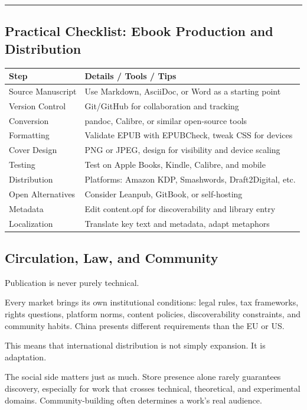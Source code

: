 \documentclass[
]{article}
\begin{document}
\begin{center}\rule{0.5\linewidth}{0.5pt}\end{center}

\hypertarget{practical-checklist-ebook-production-and-distribution}{%
\subsection{Practical Checklist: Ebook Production and
Distribution}\label{practical-checklist-ebook-production-and-distribution}}

\begin{longtable}[]{@{}ll@{}}
\toprule
Step & Details / Tools / Tips\tabularnewline
\midrule
\endhead
Source Manuscript & Use Markdown, AsciiDoc, or Word as a starting
point\tabularnewline
Version Control & Git/GitHub for collaboration and
tracking\tabularnewline
Conversion & pandoc, Calibre, or similar open-source
tools\tabularnewline
Formatting & Validate EPUB with EPUBCheck, tweak CSS for
devices\tabularnewline
Cover Design & PNG or JPEG, design for visibility and device
scaling\tabularnewline
Testing & Test on Apple Books, Kindle, Calibre, and
mobile\tabularnewline
Distribution & Platforms: Amazon KDP, Smashwords, Draft2Digital,
etc.\tabularnewline
Open Alternatives & Consider Leanpub, GitBook, or
self-hosting\tabularnewline
Metadata & Edit content.opf for discoverability and library
entry\tabularnewline
Localization & Translate key text and metadata, adapt
metaphors\tabularnewline
\bottomrule
\end{longtable}

\hypertarget{circulation-law-and-community}{%
\subsection{Circulation, Law, and
Community}\label{circulation-law-and-community}}

Publication is never purely technical.

Every market brings its own institutional conditions: legal rules, tax
frameworks, rights questions, platform norms, content policies,
discoverability constraints, and community habits. China presents
different requirements than the EU or US.

This means that international distribution is not simply expansion. It
is adaptation.

The social side matters just as much. Store presence alone rarely
guarantees discovery, especially for work that crosses technical,
theoretical, and experimental domains. Community-building often
determines a work's real audience.
\end{document}
